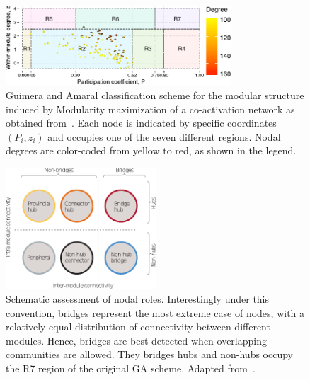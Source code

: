 \begin{figure}[htb!]
\centering
\includegraphics[width=0.75\textwidth]{images/guimera_amaral_coact_q.pdf}
\caption{Guimera and Amaral classification scheme for the modular structure induced by Modularity maximization of a co-activation network as obtained from~\cite{crossley2013a}.
Each node is indicated by specific coordinates $(P_i,z_i)$ and occupies one of the seven different regions. Nodal degrees are color-coded from yellow to red, as shown in the legend.}
\label{fig:gagraph}
\end{figure}

\begin{figure}[htb!]
\centering
\includegraphics[width=0.5\textwidth]{images/hubs_nonhubs.pdf}
\caption{Schematic assessment of nodal roles.
Interestingly under this convention, bridges represent the most extreme case of nodes, with a relatively equal distribution of connectivity between different modules.
Hence, bridges are best detected when overlapping communities are allowed.
They bridges hubs and non-hubs occupy the R7 region of the original GA scheme.
Adapted from~\cite{fornito2015}.}
\label{fig:hubs_bridges}
\end{figure}


